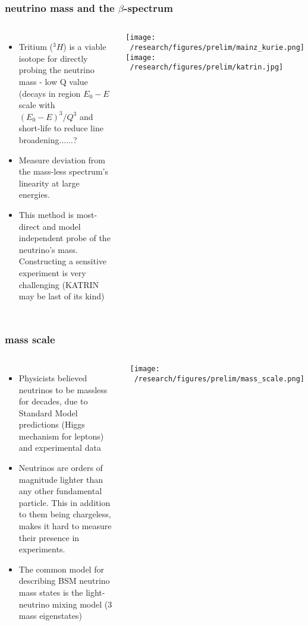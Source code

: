 \documentclass{beamer}
\begin{document}
	\begin{frame}
		\frametitle{neutrino mass and the $\beta$-spectrum}
		\begin{columns}[c] %
			
			\begin{itemize}
				\setlength\itemsep{2em}
				\item Tritium ($^3H$) is a viable isotope for directly probing the neutrino mass - low Q value (decays in region $E_0 - E$ scale with $(E_0-E)^3 / Q^3$  and short-life to reduce line broadening......?
				\item Measure deviation from the mass-less spectrum's linearity at large energies.
				\item This method is most-direct and model independent probe of the neutrino's mass. Constructing a sensitive experiment is very challenging (KATRIN may be last of its kind)
				
			\end{itemize}
			
			\texttt{[image: ~/research/figures/prelim/mainz\_kurie.png]}
			\texttt{[image: ~/research/figures/prelim/katrin.jpg]}
			
		\end{columns}
	\end{frame}
	
	\begin{frame}
		\frametitle{mass scale}
		\begin{columns}[c] %
			
			\begin{itemize}
				\setlength\itemsep{2em}
				\item Physicists  believed neutrinos to be massless for decades, due to Standard Model predictions (Higgs mechanism for leptons) and experimental data
				\item Neutrinos are orders of magnitude lighter than any other fundamental particle. This in addition to them being chargeless, makes it hard to measure their presence in experiments.
				\item The common model for describing BSM neutrino mass states is the light-neutrino mixing model (3 mass eigenstates)
				
				
			\end{itemize}
			
			\texttt{[image: ~/research/figures/prelim/mass\_scale.png]}
		
			
		\end{columns}
	\end{frame}
		
\end{document}
